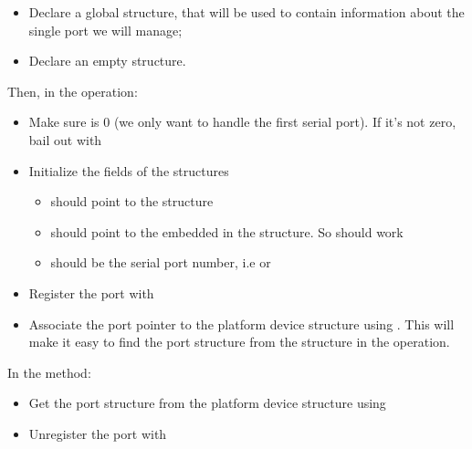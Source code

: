\begin{itemize}
\item Declare a global  structure, that will be used
  to contain information about the single port we will manage;
\item Declare an empty  structure.
\end{itemize}

Then, in the  operation:

\begin{itemize}

\item Make sure  is 0 (we only want to handle the first
  serial port). If it's not zero, bail out with 

\item Initialize the fields of the  structures

  \begin{itemize}

  \item {} should point to the  structure

  \item {} should point to the  embedded
    in the  structure. So 
    should work

  \item {} should be the serial port number, i.e  or

  \end{itemize}

\item Register the port with 

\item Associate the port pointer to the platform device structure
  using . This will make it easy to find
  the port structure from the  structure in the
   operation.

\end{itemize}

In the  method:

\begin{itemize}

\item Get the port structure from the platform device structure using

\item Unregister the port with 

\end{itemize}

